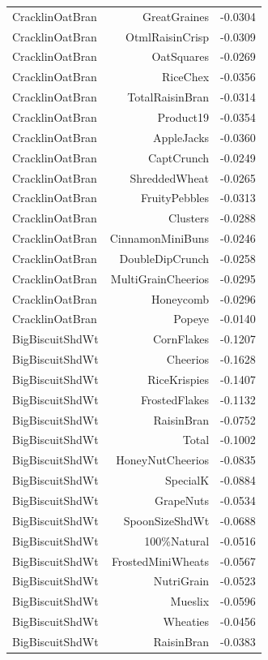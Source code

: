 \begin{longtable}{@{}lrr@{}}
CracklinOatBran & GreatGraines & -0.0304 \\
CracklinOatBran & OtmlRaisinCrisp & -0.0309 \\
CracklinOatBran & OatSquares & -0.0269 \\
CracklinOatBran & RiceChex & -0.0356 \\
CracklinOatBran & TotalRaisinBran & -0.0314 \\
CracklinOatBran & Product19 & -0.0354 \\
CracklinOatBran & AppleJacks & -0.0360 \\
CracklinOatBran & CaptCrunch & -0.0249 \\
CracklinOatBran & ShreddedWheat & -0.0265 \\
CracklinOatBran & FruityPebbles & -0.0313 \\
CracklinOatBran & Clusters & -0.0288 \\
CracklinOatBran & CinnamonMiniBuns & -0.0246 \\
CracklinOatBran & DoubleDipCrunch & -0.0258 \\
CracklinOatBran & MultiGrainCheerios & -0.0295 \\
CracklinOatBran & Honeycomb & -0.0296 \\
CracklinOatBran & Popeye & -0.0140 \\
BigBiscuitShdWt & CornFlakes & -0.1207 \\
BigBiscuitShdWt & Cheerios & -0.1628 \\
BigBiscuitShdWt & RiceKrispies & -0.1407 \\
BigBiscuitShdWt & FrostedFlakes & -0.1132 \\
BigBiscuitShdWt & RaisinBran & -0.0752 \\
BigBiscuitShdWt & Total & -0.1002 \\
BigBiscuitShdWt & HoneyNutCheerios & -0.0835 \\
BigBiscuitShdWt & SpecialK & -0.0884 \\
BigBiscuitShdWt & GrapeNuts & -0.0534 \\
BigBiscuitShdWt & SpoonSizeShdWt & -0.0688 \\
BigBiscuitShdWt & 100\%Natural & -0.0516 \\
BigBiscuitShdWt & FrostedMiniWheats & -0.0567 \\
BigBiscuitShdWt & NutriGrain & -0.0523 \\
BigBiscuitShdWt & Mueslix & -0.0596 \\
BigBiscuitShdWt & Wheaties & -0.0456 \\
BigBiscuitShdWt & RaisinBran & -0.0383 \\

\end{longtable}
